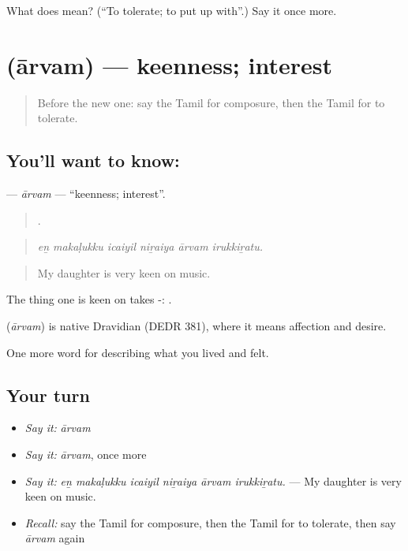 \begin{tcolorbox}[breakable,colback=teal!4,colframe=teal!35!black,title={Before you move on}]
What does  mean? (\textquotedblleft{}To tolerate; to put up with\textquotedblright{}.) Say it once more.
\end{tcolorbox}
\section[\texorpdfstring{\ta{ஆர்வம்} (ārvam)}{ஆர்வம் (ārvam)}]{ (ārvam) — keenness; interest}

\label{lesson:TA-C461-arvam}



\begin{quote}
Before the new one: say the Tamil for composure, then the Tamil for to tolerate.
\end{quote}

\subsection*{You'll want to know: }
\textbf{} — \emph{ārvam} — \textquotedblleft{}keenness; interest\textquotedblright{}.

\begin{quote}
     .
\end{quote}

\begin{quote}
\emph{eṉ makaḷukku icaiyil niṟaiya ārvam irukkiṟatu.}
\end{quote}

\begin{quote}
My daughter is very keen on music.
\end{quote}

The thing one is keen on takes -:  .

\begin{cousinweb}
\textbf{} (\emph{ārvam}) is native Dravidian (DEDR 381), where it means affection and desire.
\end{cousinweb}

\begin{grammarlens}[title={What you've built}]
One more word for describing what you lived and felt.
\end{grammarlens}

\subsection*{Your turn}
\begin{itemize}
\raggedright
  \item \emph{Say it:} \emph{ārvam}
  \item \emph{Say it:} \emph{ārvam}, once more
  \item \emph{Say it:} \emph{eṉ makaḷukku icaiyil niṟaiya ārvam irukkiṟatu.} — My daughter is very keen on music.
  \item \emph{Recall:} say the Tamil for composure, then the Tamil for to tolerate, then say \emph{ārvam} again
\end{itemize}

